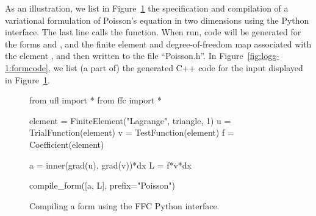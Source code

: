 As an illustration, we list in Figure~\ref{fig:logg-1:python:form} the
specification and compilation of a variational formulation of
Poisson's equation in two dimensions using the Python interface. The
last line calls the  function. When run, code will
be generated for the forms  and , and the finite element
and degree-of-freedom map associated with the element
, and then written to the file ``Poisson.h''.
In Figure~\ref{fig:logg-1:formcode}, we list (a part of) the generated
C++ code for the input displayed in Figure~\ref{fig:logg-1:python:form}.

\begin{figure}
\bwfig
  \begin{python}
from ufl import *
from ffc import *

element = FiniteElement("Lagrange", triangle, 1)
u = TrialFunction(element)
v = TestFunction(element)
f = Coefficient(element)

a = inner(grad(u), grad(v))*dx
L = f*v*dx

compile_form([a, L], prefix="Poisson")
  \end{python}
  \caption{Compiling a form using the FFC Python interface.}
  \label{fig:logg-1:python:form}
\end{figure}

